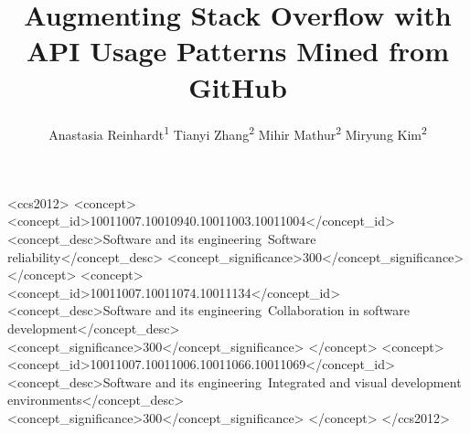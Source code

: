 \documentclass[sigconf, review]{acmart}
\begin{document}
\title{Augmenting Stack Overflow with API Usage Patterns Mined from GitHub}

\author{Anastasia Reinhardt\textsuperscript{1}\footnotemark\,\,Tianyi Zhang\textsuperscript{2}\,\,Mihir Mathur\textsuperscript{2}\,\,Miryung Kim\textsuperscript{2}}


%
%
%




\begin{CCSXML}
<ccs2012>
<concept>
<concept_id>10011007.10010940.10011003.10011004</concept_id>
<concept_desc>Software and its engineering~Software reliability</concept_desc>
<concept_significance>300</concept_significance>
</concept>
<concept>
<concept_id>10011007.10011074.10011134</concept_id>
<concept_desc>Software and its engineering~Collaboration in software development</concept_desc>
<concept_significance>300</concept_significance>
</concept>
<concept>
<concept_id>10011007.10011006.10011066.10011069</concept_id>
<concept_desc>Software and its engineering~Integrated and visual development environments</concept_desc>
<concept_significance>300</concept_significance>
</concept>
</ccs2012>
\end{CCSXML}



\maketitle
\end{document}

